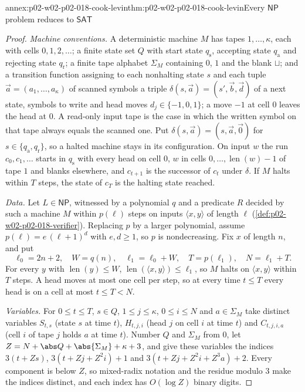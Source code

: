 \begin{annexitem}{annex:p02-w02-p02-018-cook-levin}{thm:p02-w02-p02-018-cook-levin}{Every \(\mathsf{NP}\) problem reduces to \(\mathsf{SAT}\)}
\begin{proof}
\emph{Machine conventions.}  A deterministic machine \(M\) has tapes
\(1,\ldots,\kappa\), each with cells \(0,1,2,\ldots\); a finite state set
\(Q\) with start state \(q_{\mathrm s}\), accepting state \(q_{\mathrm a}\)
and rejecting state \(q_{\mathrm r}\); a finite tape alphabet \(\Sigma_M\)
containing \(0\), \(1\) and the blank \(\sqcup\); and a transition function
assigning to each nonhalting state \(s\) and each tuple
\(\vec a=(a_1,\ldots,a_\kappa)\) of scanned symbols a triple
\(\delta(s,\vec a)=(s',\vec b,\vec d)\) of a next state, symbols to write and
head moves \(d_j\in\{-1,0,1\}\); a move \(-1\) at cell \(0\) leaves the head
at \(0\).  A read-only input tape is the case in which the written symbol on
that tape always equals the scanned one.  Put
\(\delta(s,\vec a)=(s,\vec a,\vec 0)\) for \(s\in\{q_{\mathrm a},
q_{\mathrm r}\}\), so a halted machine stays in its configuration.  On input
\(w\) the run \(c_0,c_1,\ldots\) starts in \(q_{\mathrm s}\) with every head
on cell \(0\), \(w\) in cells \(0,\ldots,\operatorname{len}(w)-1\) of tape \(1\) and blanks
elsewhere, and \(c_{t+1}\) is the successor of \(c_t\) under \(\delta\).  If
\(M\) halts within \(T\) steps, the state of \(c_T\) is the halting state
reached.

\emph{Data.}  Let \(L\in\mathsf{NP}\), witnessed by a polynomial \(q\) and a
predicate \(R\) decided by such a machine \(M\) within \(p(\ell)\) steps on
inputs \(\langle x,y\rangle\) of length \(\ell\)
(\cref{def:p02-w02-p02-018-verifier}).  Replacing \(p\) by a larger
polynomial, assume \(p(\ell)=e\,(\ell+1)^{d}\) with \(e,d\geq1\), so \(p\) is
nondecreasing.  Fix \(x\) of length \(n\), and put
\[
 \ell_0=2n+2,\quad W=q(n),\quad \ell_1=\ell_0+W,\quad T=p(\ell_1),\quad
 N=\ell_1+T.
\]
For every \(y\) with \(\operatorname{len}(y)\leq W\), \(\operatorname{len}(\langle x,y\rangle)\leq\ell_1\),
so \(M\) halts on \(\langle x,y\rangle\) within \(T\) steps.  A head moves at
most one cell per step, so at every time \(t\leq T\) every head is on a cell
at most \(t\leq T<N\).

\emph{Variables.}  For \(0\leq t\leq T\), \(s\in Q\),
\(1\leq j\leq\kappa\), \(0\leq i\leq N\) and \(a\in\Sigma_M\) take distinct
variables \(S_{t,s}\) (state \(s\) at time \(t\)), \(H_{t,j,i}\) (head \(j\) on
cell \(i\) at time \(t\)) and \(C_{t,j,i,a}\) (cell \(i\) of tape \(j\) holds
\(a\) at time \(t\)).  Number \(Q\) and \(\Sigma_M\) from \(0\), let
\(Z=N+\abs Q+\abs{\Sigma_M}+\kappa+3\), and give these variables the indices
\(3(t+Zs)\), \(3(t+Zj+Z^2i)+1\) and \(3(t+Zj+Z^2i+Z^3a)+2\).  Every component
is below \(Z\), so mixed-radix notation and the residue modulo \(3\) make the
indices distinct, and each index has \(O(\log Z)\) binary digits.


\end{proof}
\end{annexitem}
